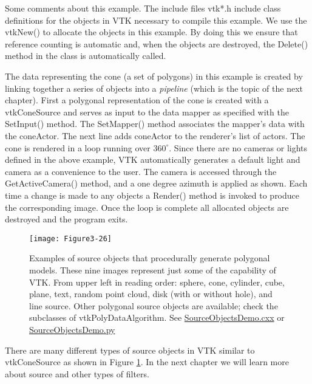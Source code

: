 \begin{description}[leftmargin=0cm,labelindent=0cm]
Some comments about this example. The include files vtk*.h include class definitions for the objects in VTK necessary to compile this example. We use the vtkNew() to allocate the objects in this example. By doing this we ensure that reference counting is automatic and, when the objects are destroyed, the Delete() method in the class is automatically called.

The data representing the cone (a set of polygons) in this example is created by linking together a series of objects into a \emph{pipeline} (which is the topic of the next chapter). First a polygonal representation of the cone is created with a vtkConeSource and serves as input to the data mapper as specified with the SetInput() method. The SetMapper() method associates the mapper's data with the coneActor. The next line adds coneActor to the renderer's list of actors. The cone is rendered in a loop running over $360^\circ$. Since there are no cameras or lights defined in the above example, VTK automatically generates a default light and camera as a convenience to the user. The camera is accessed through the GetActiveCamera() method, and a one degree azimuth is applied as shown. Each time a change is made to any objects a Render() method is invoked to produce the corresponding image. Once the loop is complete all allocated objects are destroyed and the program exits.

\begin{figure}[!htb]
  \centering
  \texttt{[image: Figure3-26]}\\
  \caption{Examples of source objects that procedurally generate polygonal models. These nine images represent just some of the capability of VTK. From upper left in reading order: sphere, cone, cylinder, cube, plane, text, random point cloud, disk (with or without hole), and line source. Other polygonal source objects are available; check the subclasses of vtkPolyDataAlgorithm. See  \href{https://lorensen.github.io/VTKExamples/site/Cxx/GeometricObjects/SourceObjectsDemo/}{SourceObjectsDemo.cxx} or \href{https://lorensen.github.io/VTKExamples/site/Python/GeometricObjects/SourceObjectsDemo/}{SourceObjectsDemo.py}}\label{fig:Figure3-26}
\end{figure}

There are many different types of source objects in VTK similar to vtkConeSource as shown in Figure \ref{fig:Figure3-26}. In the next chapter we will learn more about source and other types of filters.


\end{description}
